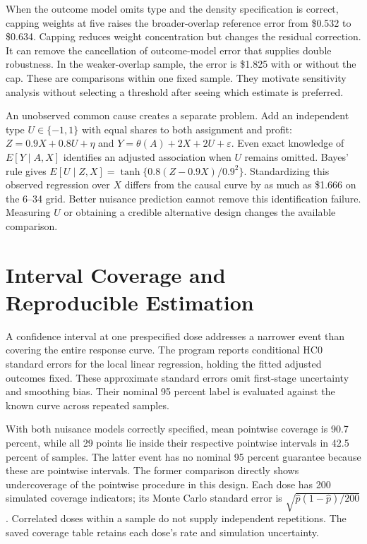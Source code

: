 When the outcome model omits type and the density specification is
correct, capping weights at five raises the broader-overlap reference
error from \$0.532 to \$0.634. Capping reduces weight concentration but
changes the residual correction. It can remove the cancellation of
outcome-model error that supplies double robustness. In the
weaker-overlap sample, the error is \$1.825 with or without the cap.
These are comparisons within one fixed sample. They motivate sensitivity
analysis without selecting a threshold after seeing which estimate is
preferred.

An unobserved common cause creates a separate problem. Add an
independent type \(U\in\{-1,1\}\) with equal shares to both assignment
and profit: \(Z=0.9X+0.8U+\eta\) and \(Y=\theta(A)+2X+2U+\varepsilon\).
Even exact knowledge of \(E[Y\mid A,X]\) identifies an adjusted
association when \(U\) remains omitted. Bayes' rule gives
\(E[U\mid Z,X]=\tanh\{0.8(Z-0.9X)/0.9^2\}\). Standardizing this observed
regression over \(X\) differs from the causal curve by as much as
\$1.666 on the 6--34 grid. Better nuisance prediction cannot remove this
identification failure. Measuring \(U\) or obtaining a credible
alternative design changes the available comparison.

\hypertarget{M06-interval-coverage-and-reproducible-estimation}{%
\section{Interval Coverage and Reproducible
Estimation}\label{M06-interval-coverage-and-reproducible-estimation}}

\noindent \noindent A confidence interval at one prespecified dose addresses a
narrower event than covering the entire response curve. The program
reports conditional HC0 standard errors for the local linear regression,
holding the fitted adjusted outcomes fixed. These approximate standard
errors omit first-stage uncertainty and smoothing bias. Their nominal 95
percent label is evaluated against the known curve across repeated
samples.

With both nuisance models correctly specified, mean pointwise coverage
is 90.7 percent, while all 29 points lie inside their respective
pointwise intervals in 42.5 percent of samples. The latter event has no
nominal 95 percent guarantee because these are pointwise intervals. The
former comparison directly shows undercoverage of the pointwise
procedure in this design. Each dose has 200 simulated coverage
indicators; its Monte Carlo standard error is
\(\sqrt{\widehat p(1-\widehat p)/200}\). Correlated doses within a
sample do not supply independent repetitions. The saved coverage table
retains each dose's rate and simulation uncertainty.

